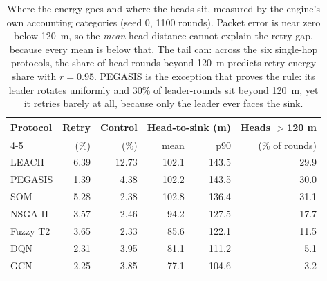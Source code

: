 \begin{table}[!t]
\caption{Where the energy goes and where the heads sit, measured by the engine's own accounting categories (seed 0, 1100 rounds). Packet error is near zero below 120~m, so the \emph{mean} head distance cannot explain the retry gap, because every mean is below that. The tail can: across the six single-hop protocols, the share of head-rounds beyond 120~m predicts retry energy share with $r = 0.95$. PEGASIS is the exception that proves the rule: its leader rotates uniformly and 30\% of leader-rounds sit beyond 120~m, yet it retries barely at all, because only the leader ever faces the sink.}
\label{tab:energy-split}
\centering
\begin{tabular}{lrrrrr}
\toprule
Protocol & Retry & Control & \multicolumn{2}{c}{Head-to-sink (m)} & Heads $>$120 m \\
\cmidrule(lr){4-5}
 & (\%) & (\%) & mean & p90 & (\% of rounds) \\
\midrule
LEACH & 6.39 & 12.73 & 102.1 & 143.5 & 29.9 \\
PEGASIS & 1.39 & 4.38 & 102.2 & 143.5 & 30.0 \\
SOM & 5.28 & 2.38 & 102.8 & 136.4 & 31.1 \\
NSGA-II & 3.57 & 2.46 & 94.2 & 127.5 & 17.7 \\
Fuzzy T2 & 3.65 & 2.33 & 85.6 & 122.1 & 11.5 \\
DQN & 2.31 & 3.95 & 81.1 & 111.2 & 5.1 \\
GCN & 2.25 & 3.85 & 77.1 & 104.6 & 3.2 \\
\bottomrule
\end{tabular}
\end{table}
